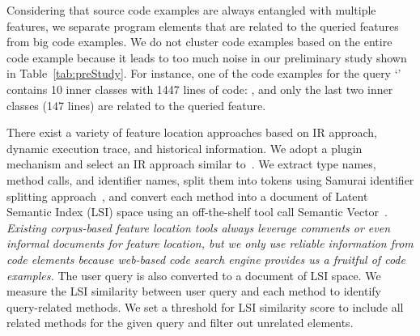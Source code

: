   Considering that source code examples are always entangled with multiple features, we separate program elements that are related to the queried features from big code examples. We do not cluster code examples based on the entire code example because it leads to too much noise in our preliminary study shown in Table~\ref{tab:preStudy}. For instance, one of the code examples for the query `' contains 10 inner classes with 1447 lines of code: , and only the last two inner classes (147 lines) are related to the queried feature. 

There exist a variety of feature location approaches based on IR approach, dynamic execution trace, and historical information. We adopt a plugin mechanism and select an IR approach similar to~\cite{Marcus:LSI04}.
 We extract type names, method calls, and  identifier names, split them  into tokens using Samurai identifier splitting approach~\cite{samurai:msr09}, and convert each method into a document of Latent Semantic Index (LSI) space using an off-the-shelf tool call Semantic Vector~\cite{semanticVector:10}. \textit{Existing corpus-based feature location tools always leverage comments or even informal documents for feature location, but we only use reliable information from code elements because web-based code search engine provides us a fruitful of code examples.}
The user query is also converted to a document of LSI space.  We measure the  LSI similarity between user query and each method to identify query-related methods.  We set  a threshold for LSI similarity score to include all related methods for the given query and filter out unrelated elements. 


